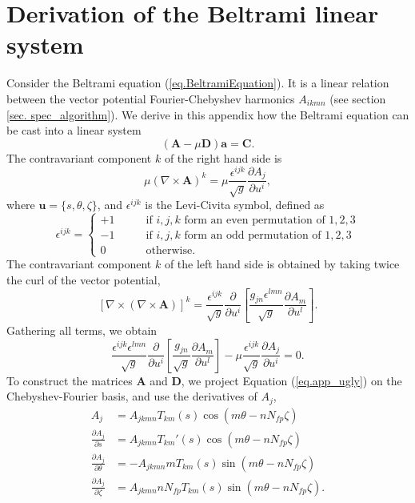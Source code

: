 \chapter{Derivation of the Beltrami linear system} \label{app. beltrami eq coef derivation}
Consider the Beltrami equation (\ref{eq.BeltramiEquation}). It is a linear relation between the vector potential Fourier-Chebyshev harmonics $A_{ikmn}$ (see section \ref{sec. spec_algorithm}). We derive in this appendix how the Beltrami equation can be cast into a linear system
\begin{equation}
	\left(\mathbf{A}-\mu\mathbf{D}\right)\mathbf{a} = \mathbf{C}.
\end{equation}
The contravariant component $k$ of the right hand side is
\begin{equation}
	\mu(\nabla\times\mathbf{A})^k = \mu\frac{\epsilon^{ijk}}{\sqrt{g}}\frac{\partial A_j}{\partial u^i},
\end{equation}
where $\mathbf{u}=\{s,\theta,\zeta\}$, and $\epsilon^{ijk}$ is the Levi-Civita symbol, defined as
\begin{equation}
	\epsilon^{ijk} = \begin{cases}
		+1 \qquad& \text{if $i,j,k$ form an even permutation of $1,2,3$}\\
		-1 \qquad& \text{if $i,j,k$ form an odd permutation of $1,2,3$}\\
		0  \qquad& \text{otherwise}.
	\end{cases}
\end{equation}
The contravariant component $k$ of the left hand side is obtained by taking twice the curl of the vector potential,
\begin{equation}
	\left[\nabla\times(\nabla\times\mathbf{A})\right]^k = \frac{\epsilon^{ijk}}{\sqrt{g}}\frac{\partial}{\partial u^i}\left[\frac{g_{jn}\epsilon^{lmn}}{\sqrt{g}}\frac{\partial A_m}{\partial u^l}\right].
\end{equation}
Gathering all terms, we obtain
\begin{equation}
 	\frac{\epsilon^{ijk}\epsilon^{lmn}}{\sqrt{g}}\frac{\partial}{\partial u^i}\left[\frac{g_{jn}}{\sqrt{g}}\frac{\partial A_m}{\partial u^l}\right] - \mu\frac{\epsilon^{ijk}}{\sqrt{g}}\frac{\partial A_j}{\partial u^i} = 0.\label{eq.app_ugly}
\end{equation}
To construct the matrices $\mathbf{A}$ and $\mathbf{D}$, we project Equation (\ref{eq.app_ugly}) on the Chebyshev-Fourier basis, and use the derivatives of $A_j$,
\begin{align}
	A_j &= A_{jkmn} T_{km}(s)\cos(m\theta-nN_{fp}\zeta)\\
	\frac{\partial A_j}{\partial s} &=  A_{jkmn} T_{km}'(s)\cos(m\theta-nN_{fp}\zeta)\\
	\frac{\partial A_j}{\partial \theta} &=  -A_{jkmn} mT_{km}(s)\sin(m\theta-nN_{fp}\zeta)\\
	\frac{\partial A_j}{\partial \zeta} &=  A_{jkmn} nN_{fp}T_{km}(s)\sin(m\theta-nN_{fp}\zeta).
\end{align}

